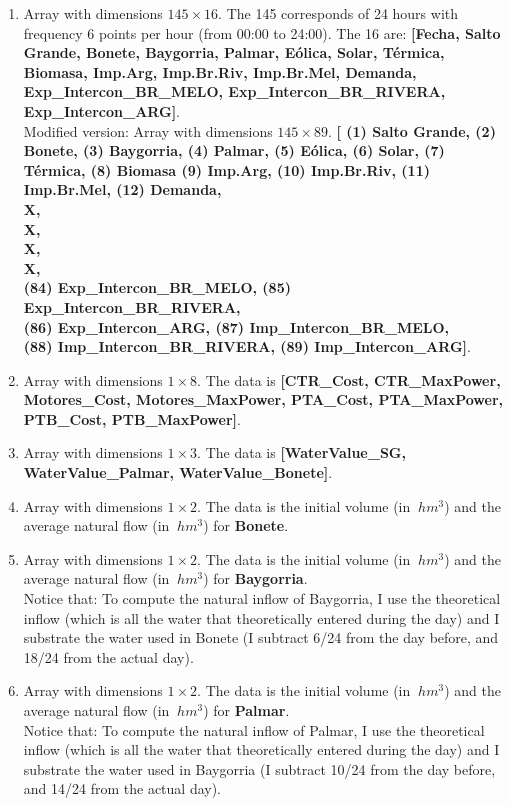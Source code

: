 \documentclass[12pt]{article}
\theoremstyle{definition}
\theoremstyle{remark}
\begin{document}
\begin{enumerate}

\item Array with dimensions $145\times16$. The 145 corresponds of 24 hours with frequency 6 points per hour (from 00:00 to 24:00). The 16 are: \textbf{[Fecha, Salto Grande, Bonete, Baygorria, Palmar, E\'olica, Solar, T\'ermica, Biomasa,	Imp.Arg, Imp.Br.Riv, Imp.Br.Mel, Demanda, Exp\_Intercon\_BR\_MELO, Exp\_Intercon\_BR\_RIVERA, Exp\_Intercon\_ARG]}.\\
{\color{red} Modified version}: Array with dimensions $145\times89$. \textbf{[{\color{blue} (1) Salto Grande, (2) Bonete, (3) Baygorria, (4) Palmar, (5) E\'olica, (6) Solar, (7) T\'ermica, (8) Biomasa (9) Imp.Arg, (10) Imp.Br.Riv, (11) Imp.Br.Mel, (12) Demanda},\\
X,\\
X,\\
X,\\
X,\\
{\color{blue} (84) Exp\_Intercon\_BR\_MELO, (85) Exp\_Intercon\_BR\_RIVERA,\\
 (86) Exp\_Intercon\_ARG, (87) Imp\_Intercon\_BR\_MELO,\\
  (88) Imp\_Intercon\_BR\_RIVERA, (89) Imp\_Intercon\_ARG}]}.

\item Array with dimensions $1\times8$. The data is \textbf{[CTR\_Cost, CTR\_MaxPower, Motores\_Cost, Motores\_MaxPower, PTA\_Cost, PTA\_MaxPower, PTB\_Cost, PTB\_MaxPower]}.

\item Array with dimensions $1\times3$. The data is \textbf{[WaterValue\_SG, WaterValue\_Palmar, WaterValue\_Bonete]}.

\item Array with dimensions $1\times2$. The data is the initial volume (in $\SI{}{hm^3}$) and the average natural flow (in $\SI{}{hm^3}$) for \textbf{Bonete}.

\item Array with dimensions $1\times2$. The data is the initial volume (in $\SI{}{hm^3}$) and the average natural flow (in $\SI{}{hm^3}$) for \textbf{Baygorria}.\\
{\color{red} Notice that}: To compute the natural inflow of Baygorria, I use the theoretical inflow (which is all the water that theoretically entered during the day) and I substrate the water used in Bonete (I subtract 6/24 from the day before, and 18/24 from the actual day).

\item Array with dimensions $1\times2$. The data is the initial volume (in $\SI{}{hm^3}$) and the average natural flow (in $\SI{}{hm^3}$) for \textbf{Palmar}.\\
{\color{red} Notice that}: To compute the natural inflow of Palmar, I use the theoretical inflow (which is all the water that theoretically entered during the day) and I substrate the water used in Baygorria (I subtract 10/24 from the day before, and 14/24 from the actual day).


\end{enumerate}
\end{document}
